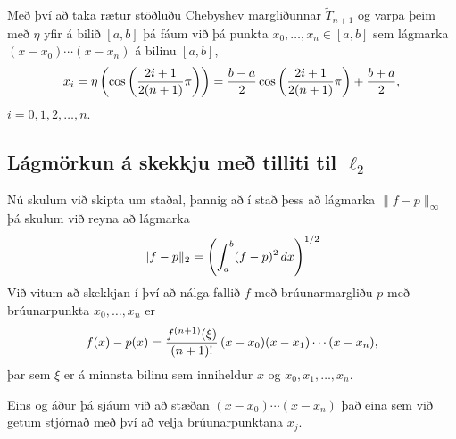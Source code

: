 \documentclass[letterpaper,10pt,icelandic]{sphinxmanual}
\begin{document}
Með því að taka rætur stöðluðu Chebyshev margliðunnar
\(\tilde T_{n+1}\) og varpa þeim með \(\eta\) yfir á bilið
\([a,b]\) þá fáum við þá punkta \(x_0,\ldots,x_n \in [a,b]\) sem
lágmarka \((x-x_0)\cdots (x-x_n)\) á bilinu \([a,b]\),
\begin{gather}
\begin{split}x_i = \eta\left(\cos\left(\frac{2i+1}{2(n+1)}\pi\right)\right)
    = \frac{b-a}2 \cos\left(\frac{2i+1}{2(n+1)}\pi\right) + \frac{b+a}2,\end{split}\notag
\end{gather}
\(i=0,1,2,\ldots,n\).


\subsection{Lágmörkun á skekkju með tilliti til \(\ell_2\)}
\label{kafli03:lagmorkun-a-skekkju-me-tilliti-til}
Nú skulum við skipta um staðal, þannig að í stað þess að lágmarka
\(\|f-p\|_\infty\) þá skulum við reyna að lágmarka
\begin{gather}
\begin{split}\|f-p\|_2 = \left(\int_a^b (f-p)^2\, dx\right)^{1/2}\end{split}\notag
\end{gather}
Við vitum að skekkjan í því að nálga fallið \(f\) með
brúunarmargliðu \(p\) með brúunarpunkta \(x_0,\ldots,x_n\) er
\begin{gather}
\begin{split}f(x)-p(x) = \frac{f^{(n+1)}(\xi)}{(n+1)!}\, (x-x_0)(x-x_1)\cdots (x-x_n),\end{split}\notag
\end{gather}
þar sem \(\xi\) er á minnsta bilinu sem inniheldur \(x\) og
\(x_0,x_1,\ldots,x_n\).

Eins og áður þá sjáum við að stæðan \((x-x_0)\cdots(x-x_n)\) það
eina sem við getum stjórnað með því að velja brúunarpunktana
\(x_j\).

\end{document}
